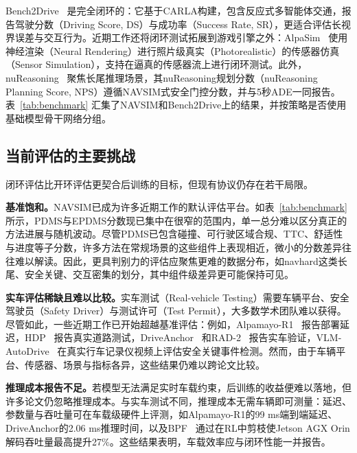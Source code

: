 \documentclass[runningheads]{llncs}
\begin{document}
Bench2Drive~\cite{bench2drive2024} 是完全闭环的：它基于CARLA构建，包含反应式多智能体交通，报告驾驶分数（Driving Score, DS）与成功率（Success Rate, SR），更适合评估长视界误差与交互行为。近期工作还将闭环测试拓展到游戏引擎之外：AlpaSim~\cite{alpasim2025} 使用神经渲染（Neural Rendering）进行照片级真实（Photorealistic）的传感器仿真（Sensor Simulation），支持在逼真的传感器流上进行闭环测试。此外，nuReasoning~\cite{nureasoning2026} 聚焦长尾推理场景，其nuReasoning规划分数（nuReasoning Planning Score, NPS）遵循NAVSIM式安全门控分数，并与5秒ADE一同报告。表~\ref{tab:benchmark} 汇集了NAVSIM和Bench2Drive上的结果，并按策略是否使用基础模型骨干网络分组。


\vspace{-0.5cm}

\subsection{当前评估的主要挑战}
\label{sec:eval:challenges}

闭环评估比开环评估更契合后训练的目标，但现有协议仍存在若干局限。

\textbf{基准饱和。}NAVSIM已成为许多近期工作的默认评估平台。如表~\ref{tab:benchmark} 所示，PDMS与EPDMS分数现已集中在很窄的范围内，单一总分难以区分真正的方法进展与随机波动。尽管PDMS已包含碰撞、可行驶区域合规、TTC、舒适性与进度等子分数，许多方法在常规场景的这些组件上表现相近，微小的分数差异往往难以解读。因此，更具判别力的评估应聚焦更难的数据分布，如navhard这类长尾、安全关键、交互密集的划分，其中组件级差异更可能保持可见。

\textbf{实车评估稀缺且难以比较。}实车测试（Real-vehicle Testing）需要车辆平台、安全驾驶员（Safety Driver）与测试许可（Test Permit），大多数学术团队难以获得。尽管如此，一些近期工作已开始超越基准评估：例如，Alpamayo-R1~\cite{alpamayo2025} 报告部署延迟，HDP~\cite{hdp2026} 报告真实道路测试，DriveAnchor~\cite{driveanchor2026} 和RAD-2~\cite{rad2_2026} 报告实车验证，VLM-AutoDrive~\cite{vlmautodrive2026} 在真实行车记录仪视频上评估安全关键事件检测。然而，由于车辆平台、传感器、场景与指标各异，这些结果仍难以跨论文比较。


\textbf{推理成本报告不足。}若模型无法满足实时车载约束，后训练的收益便难以落地，但许多论文仍忽略推理成本。与实车测试不同，推理成本无需车辆即可测量：延迟、参数量与吞吐量可在车载级硬件上评测，如Alpamayo-R1的99 ms端到端延迟、DriveAnchor的2.06 ms推理时间，以及BPF~\cite{bpf2026} 通过在RL中剪枝使Jetson AGX Orin解码吞吐量最高提升27\%。这些结果表明，车载效率应与闭环性能一并报告。
\end{document}
